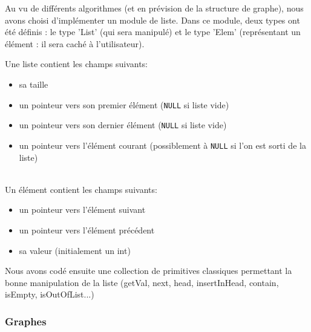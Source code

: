 \documentclass[a4paper,10pt]{article}
\newcommand*{\itemb}{\item[$\bullet$]}
\begin{document}
Au vu de différents algorithmes (et en prévision de la structure de graphe), nous avons choisi d'implémenter un module de liste.
Dans ce module, deux types ont été définis : le type 'List' (qui sera manipulé) et le type 'Elem' (représentant un élément : il sera caché à l'utilisateur).

Une liste contient les champs suivants:
\begin{itemize}
	\itemb sa taille
	\itemb un pointeur vers son premier élément (\texttt{NULL} si liste vide)
	\itemb un pointeur vers son dernier élément (\texttt{NULL} si liste vide)
	\itemb un pointeur vers l'élément courant (possiblement à \texttt{NULL} si l'on est sorti de la liste)
\end{itemize}
~~\\
Un élément contient les champs suivants:
\begin{itemize}
	\itemb un pointeur vers l'élément suivant
	\itemb un pointeur vers l'élément précédent
	\itemb sa valeur (initialement un int)
\end{itemize}
\bigskip
Nous avons codé ensuite une collection de primitives classiques permettant la bonne manipulation de la liste (getVal, next, head, insertInHead, contain, isEmpty, isOutOfList...)

\subsubsection{Graphes}
\end{document}
